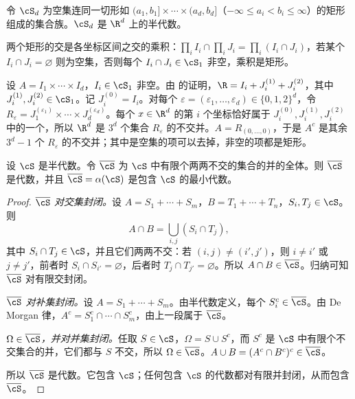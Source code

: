 \begin{example}[矩形]\label{ex:extension:Sd}
令 $\cS_d$ 为空集连同一切形如 $(a_1,b_1]\times\cdots\times(a_d,b_d]$（$-\infty\leqslant a_i<b_i\leqslant\infty$）的矩形组成的集合族。$\cS_d$ 是 $\R^d$ 上的半代数。

两个矩形的交是各坐标区间之交的乘积：$\prod_i I_i\cap\prod_i J_i=\prod_i(I_i\cap J_i)$，若某个 $I_i\cap J_i=\varnothing$ 则为空集，否则每个 $I_i\cap J_i\in\cS_1$ 非空，乘积是矩形。

设 $A=I_1\times\cdots\times I_d$，$I_i\in\cS_1$ 非空。由 的证明，$\R=I_i+J_i^{(1)}+J_i^{(2)}$，其中 $J_i^{(1)},J_i^{(2)}\in\cS_1$。记 $J_i^{(0)}=I_i$。对每个 $\varepsilon=(\varepsilon_1,\dots,\varepsilon_d)\in\{0,1,2\}^d$，令 $R_\varepsilon=J_1^{(\varepsilon_1)}\times\cdots\times J_d^{(\varepsilon_d)}$。每个 $x\in\R^d$ 的第 $i$ 个坐标恰好属于 $J_i^{(0)},J_i^{(1)},J_i^{(2)}$ 中的一个，所以 $\R^d$ 是 $3^d$ 个集合 $R_\varepsilon$ 的不交并。$A=R_{(0,\dots,0)}$，于是 $A^c$ 是其余 $3^d-1$ 个 $R_\varepsilon$ 的不交并；其中是空集的项可以去掉，非空的项都是矩形。
\end{example}

\begin{lemma}[半代数生成的代数]\label{lem:extension:algebra-from-semialgebra}
设 $\cS$ 是半代数。令 $\overline\cS$ 为 $\cS$ 中有限个两两不交的集合的并的全体。则 $\overline\cS$ 是代数，并且 $\overline\cS=\alpha(\cS)$ 是包含 $\cS$ 的最小代数。
\end{lemma}
\begin{proof}
\emph{$\overline\cS$ 对交集封闭。}设 $A=S_1+\cdots+S_m$，$B=T_1+\cdots+T_n$，$S_i,T_j\in\cS$。则
\[
A\cap B=\bigcup_{i,j}(S_i\cap T_j),
\]
其中 $S_i\cap T_j\in\cS$，并且它们两两不交：若 $(i,j)\neq(i',j')$，则 $i\neq i'$ 或 $j\neq j'$，前者时 $S_i\cap S_{i'}=\varnothing$，后者时 $T_j\cap T_{j'}=\varnothing$。所以 $A\cap B\in\overline\cS$。归纳可知 $\overline\cS$ 对有限交封闭。

\emph{$\overline\cS$ 对补集封闭。}设 $A=S_1+\cdots+S_m$。由半代数定义，每个 $S_i^c\in\overline\cS$。由 De Morgan 律，$A^c=S_1^c\cap\cdots\cap S_m^c$，由上一段属于 $\overline\cS$。

\emph{$\Omega\in\overline\cS$，并对并集封闭。}任取 $S\in\cS$，$\Omega=S\cup S^c$，而 $S^c$ 是 $\cS$ 中有限个不交集合的并，它们都与 $S$ 不交，所以 $\Omega\in\overline\cS$。$A\cup B=(A^c\cap B^c)^c\in\overline\cS$。

所以 $\overline\cS$ 是代数。它包含 $\cS$；任何包含 $\cS$ 的代数都对有限并封闭，从而包含 $\overline\cS$。
\end{proof}

